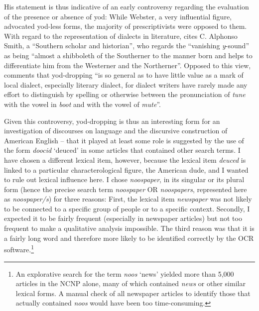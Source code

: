 His statement is thus indicative of an early controversy regarding the evaluation of the presence or absence of yod: While Webster, a very influential figure, advocated yod-less forms, the majority of prescriptivists were opposed to them. With regard to the representation of dialects in literature, \citet[239]{Krapp19251} cites C. Alphonso Smith, a “Southern scholar and historian”, who regards the “vanishing \emph{y}{}-sound” as being “almost a shibboleth of the Southerner to the manner born and helps to differentiate him from the Westerner and the Northerner”. Opposed to this view, \citet[240]{Krapp19251} comments that yod-dropping “is so general as to have little value as a mark of local dialect, especially literary dialect, for dialect writers have rarely made any effort to distinguish by spelling or otherwise between the pronunciation of \textit{tune} with the vowel in \emph{boot} and with the vowel of \emph{mute}”.


Given this controversy, yod-dropping is thus an interesting form for an investigation of discourses on language and the discursive construction of American English – that it played at least some role is suggested by the use of the form \emph{doocid} ‘deuced’ in some articles that contained other search terms. I have chosen a different lexical item, however, because the lexical item \emph{deuced} is linked to a particular characterological figure, the American dude, and I wanted to rule out lexical influence here. I chose \emph{noospaper}, in its singular or its plural form (hence the precise search term \emph{noospaper} OR \emph{noospapers}, represented here as \emph{noospaper/s}) for three reasons: First, the lexical item \emph{newspaper} was not likely to be connected to a specific group of people or to a specific context. Secondly, I expected it to be fairly frequent (especially in newspaper articles) but not too frequent to make a qualitative analysis impossible. The third reason was that it is a fairly long word and therefore more likely to be identified correctly by the OCR software.\footnote{An explorative search for the term \emph{noos} ‘news’ yielded more than 5,000 articles in the NCNP alone, many of which contained \emph{news} or other similar lexical forms. A manual check of all newspaper articles to identify those that actually contained \emph{noos} would have been too time-consuming.}

